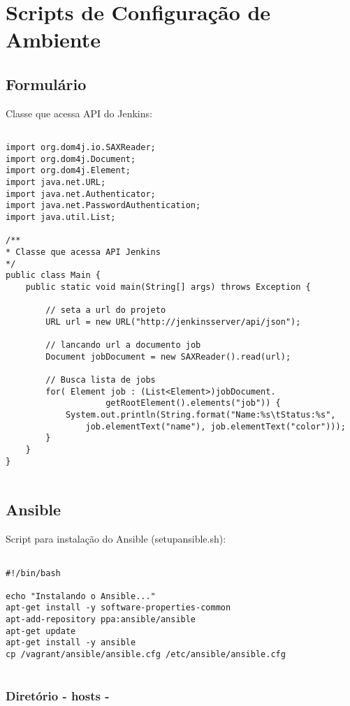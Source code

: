 \appendix

\chapter{Scripts de Configuração de Ambiente}

\section{Formulário}

\noindent
Classe que acessa API do Jenkins:

\scriptsize
\begin{lstlisting}

import org.dom4j.io.SAXReader;
import org.dom4j.Document;
import org.dom4j.Element;
import java.net.URL;
import java.net.Authenticator;
import java.net.PasswordAuthentication;
import java.util.List;
	
/**
* Classe que acessa API Jenkins
*/
public class Main {
	public static void main(String[] args) throws Exception {
	
		// seta a url do projeto 
		URL url = new URL("http://jenkinsserver/api/json");
	
		// lancando url a documento job
		Document jobDocument = new SAXReader().read(url);
	
		// Busca lista de jobs
		for( Element job : (List<Element>)jobDocument.
					getRootElement().elements("job")) {
			System.out.println(String.format("Name:%s\tStatus:%s",
				job.elementText("name"), job.elementText("color")));
		}
	}
}


\end{lstlisting}


\section{Ansible}


\noindent
Script para instalação do Ansible (setupansible.sh):


\begin{lstlisting}

#!/bin/bash

echo "Instalando o Ansible..."
apt-get install -y software-properties-common
apt-add-repository ppa:ansible/ansible
apt-get update
apt-get install -y ansible
cp /vagrant/ansible/ansible.cfg /etc/ansible/ansible.cfg


\end{lstlisting}

\subsection{Diretório - hosts -}

